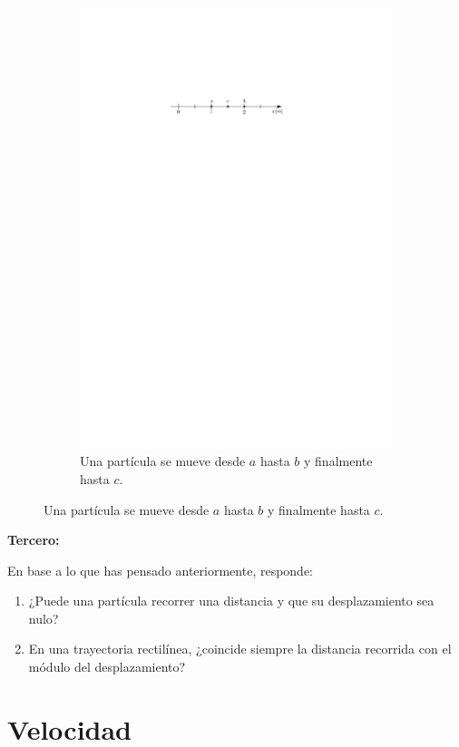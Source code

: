 \begin{comprension}
\begin{figure}[H]
\begin{subfigure}{0.5\textwidth}
 	\includegraphics[width=.9\linewidth]{img/p_t_d_ej2.pdf}
	\caption{Una partícula se mueve desde $a$ hasta $b$ y finalmente hasta $c$.}	
\end{subfigure} 
\end{figure}

\noindent
{\bf Tercero:}

En base a lo que has pensado anteriormente, responde:
\begin{enumerate}
\item ¿Puede una partícula recorrer una distancia y que su desplazamiento sea nulo?
\item En una trayectoria rectilínea, ¿coincide siempre la distancia recorrida con el módulo del desplazamiento?
\end{enumerate}
\end{comprension}

\section{Velocidad}

